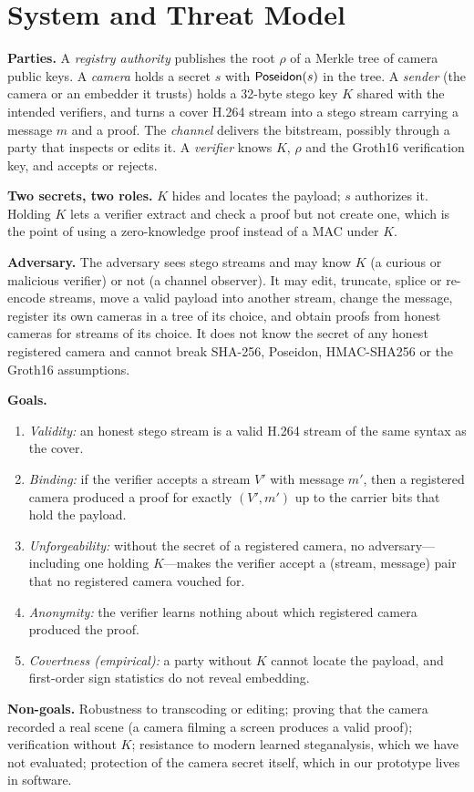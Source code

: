 \section{System and Threat Model}
\label{sec:threat}

\textbf{Parties.} A \emph{registry authority} publishes the root $\rho$ of a Merkle tree of camera public keys. A \emph{camera} holds a secret $s$ with $\mathsf{Poseidon}(s)$ in the tree. A \emph{sender} (the camera or an embedder it trusts) holds a 32-byte stego key $K$ shared with the intended verifiers, and turns a cover H.264 stream into a stego stream carrying a message $m$ and a proof. The \emph{channel} delivers the bitstream, possibly through a party that inspects or edits it. A \emph{verifier} knows $K$, $\rho$ and the Groth16 verification key, and accepts or rejects.

\textbf{Two secrets, two roles.} $K$ hides and locates the payload; $s$ authorizes it. Holding $K$ lets a verifier extract and check a proof but not create one, which is the point of using a zero-knowledge proof instead of a MAC under $K$.

\textbf{Adversary.} The adversary sees stego streams and may know $K$ (a curious or malicious verifier) or not (a channel observer). It may edit, truncate, splice or re-encode streams, move a valid payload into another stream, change the message, register its own cameras in a tree of its choice, and obtain proofs from honest cameras for streams of its choice. It does not know the secret of any honest registered camera and cannot break SHA-256, Poseidon, HMAC-SHA256 or the Groth16 assumptions.

\textbf{Goals.}
\begin{enumerate}
\item[G1] \emph{Validity:} an honest stego stream is a valid H.264 stream of the same syntax as the cover.
\item[G2] \emph{Binding:} if the verifier accepts a stream $V'$ with message $m'$, then a registered camera produced a proof for exactly $(V',m')$ up to the carrier bits that hold the payload.
\item[G3] \emph{Unforgeability:} without the secret of a registered camera, no adversary---including one holding $K$---makes the verifier accept a (stream, message) pair that no registered camera vouched for.
\item[G4] \emph{Anonymity:} the verifier learns nothing about which registered camera produced the proof.
\item[G5] \emph{Covertness (empirical):} a party without $K$ cannot locate the payload, and first-order sign statistics do not reveal embedding.
\end{enumerate}

\textbf{Non-goals.} Robustness to transcoding or editing; proving that the camera recorded a real scene (a camera filming a screen produces a valid proof); verification without $K$; resistance to modern learned steganalysis, which we have not evaluated; protection of the camera secret itself, which in our prototype lives in software.
